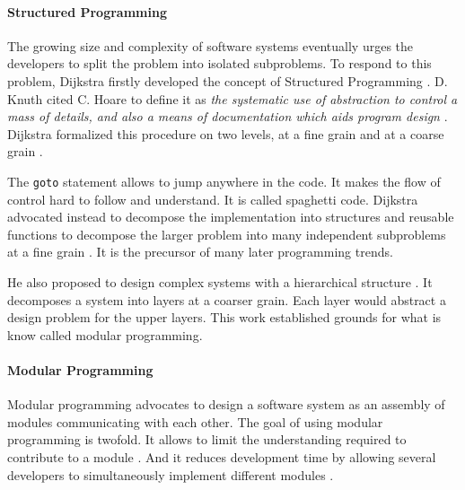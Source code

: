 \paragraph{Structured Programming}


The growing size and complexity of software systems eventually urges the developers to split the problem into isolated subproblems.
To respond to this problem, Dijkstra firstly developed the concept of Structured Programming \cite{Dijkstra1970}.
D. Knuth cited C. Hoare to define it as \textit{the systematic use of abstraction to control a mass of details, and also a means of documentation which aids program design} \cite{Knuth1974}.
Dijkstra formalized this procedure on two levels, at a fine grain and at a coarse grain \cite{Dijkstra1968a,Dijkstra1968}.

The \texttt{goto} statement allows to jump anywhere in the code.
It makes the flow of control hard to follow and understand.
It is called spaghetti code.
Dijkstra advocated instead to decompose the implementation into structures and reusable functions to decompose the larger problem into many independent subproblems at a fine grain \cite{Dijkstra1968a}.
It is the precursor of many later programming trends.


He also proposed to design complex systems with a hierarchical structure \cite{Dijkstra1968}.
It decomposes a system into layers at a coarser grain.
Each layer would abstract a design problem for the upper layers.
This work established grounds for what is know called modular programming.


\paragraph{Modular Programming}

Modular programming advocates to design a software system as an assembly of modules communicating with each other.
The goal of using modular programming is twofold.
It allows to limit the understanding required to contribute to a module \cite{Stevens1974}.
And it reduces development time by allowing several developers to simultaneously implement different modules \cite{Wong2009,Cataldo2006}.

